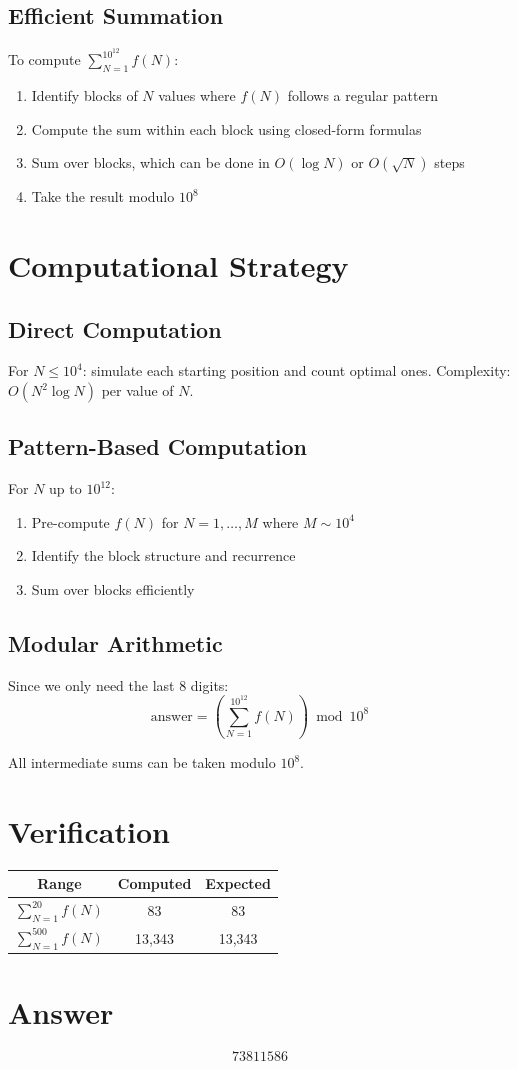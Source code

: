 \documentclass[11pt]{article}
\begin{document}
\subsection{Efficient Summation}

To compute $\sum_{N=1}^{10^{12}} f(N)$:

\begin{enumerate}
\item Identify blocks of $N$ values where $f(N)$ follows a regular pattern
\item Compute the sum within each block using closed-form formulas
\item Sum over blocks, which can be done in $O(\log N)$ or $O(\sqrt{N})$ steps
\item Take the result modulo $10^8$
\end{enumerate}

\section{Computational Strategy}

\subsection{Direct Computation}

For $N \leq 10^4$: simulate each starting position and count optimal ones.
Complexity: $O(N^2 \log N)$ per value of $N$.

\subsection{Pattern-Based Computation}

For $N$ up to $10^{12}$:
\begin{enumerate}
\item Pre-compute $f(N)$ for $N = 1, \ldots, M$ where $M \sim 10^4$
\item Identify the block structure and recurrence
\item Sum over blocks efficiently
\end{enumerate}

\subsection{Modular Arithmetic}

Since we only need the last 8 digits:
\[
\text{answer} = \left(\sum_{N=1}^{10^{12}} f(N)\right) \bmod 10^8
\]

All intermediate sums can be taken modulo $10^8$.

\section{Verification}

\begin{center}
\begin{tabular}{|c|c|c|}
\hline
Range & Computed & Expected \\
\hline
$\sum_{N=1}^{20} f(N)$ & 83 & 83 \\
$\sum_{N=1}^{500} f(N)$ & 13{,}343 & 13{,}343 \\
\hline
\end{tabular}
\end{center}

\section{Answer}

\[
\boxed{73811586}
\]
\end{document}
